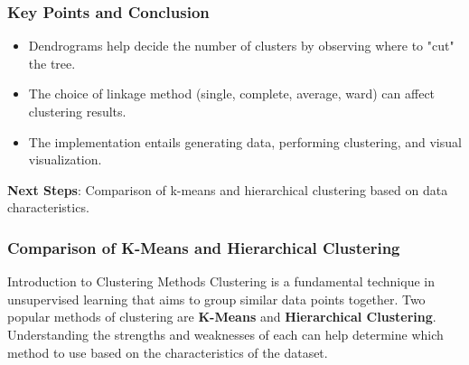 \documentclass[aspectratio=169]{beamer}
\begin{document}
\begin{frame}[fragile]
    \frametitle{Key Points and Conclusion}
    \begin{itemize}
        \item Dendrograms help decide the number of clusters by observing where to "cut" the tree.
        \item The choice of linkage method (single, complete, average, ward) can affect clustering results.
        \item The implementation entails generating data, performing clustering, and visual visualization.
    \end{itemize}
    
    \textbf{Next Steps}: Comparison of k-means and hierarchical clustering based on data characteristics.
\end{frame}

\begin{frame}[fragile]
    \frametitle{Comparison of K-Means and Hierarchical Clustering}
    
    \begin{block}{Introduction to Clustering Methods}
        Clustering is a fundamental technique in unsupervised learning that aims to group similar data points together. Two popular methods of clustering are \textbf{K-Means} and \textbf{Hierarchical Clustering}. Understanding the strengths and weaknesses of each can help determine which method to use based on the characteristics of the dataset.
    \end{block}
\end{frame}
\end{document}
